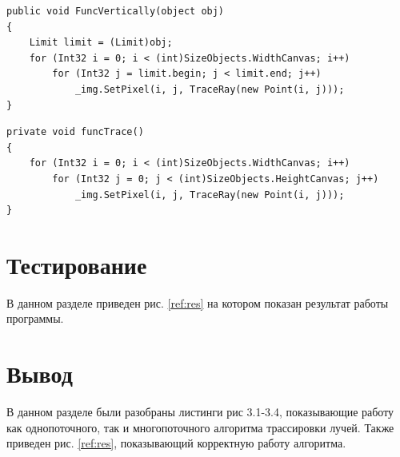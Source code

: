 \begin{lstlisting}[label=some-code,caption=Метод потока разбиения вертикально]
public void FuncVertically(object obj)
{
	Limit limit = (Limit)obj;
	for (Int32 i = 0; i < (int)SizeObjects.WidthCanvas; i++)
		for (Int32 j = limit.begin; j < limit.end; j++)
			_img.SetPixel(i, j, TraceRay(new Point(i, j)));
}
\end{lstlisting}

\begin{lstlisting}[label=some-code,caption=Однопоточный метод трассировки лучей.]
private void funcTrace()
{
	for (Int32 i = 0; i < (int)SizeObjects.WidthCanvas; i++)
		for (Int32 j = 0; j < (int)SizeObjects.HeightCanvas; j++)
			_img.SetPixel(i, j, TraceRay(new Point(i, j)));
}
\end{lstlisting}

\section{Тестирование}

В данном разделе приведен рис. \ref{ref:res} на котором показан результат работы программы.

\begin{figure}[ht!]
\end{figure}


\section{Вывод}

В данном разделе были разобраны листинги рис 3.1-3.4, показывающие работу как однопоточного, так и многопоточного
алгоритма трассировки лучей. Также приведен рис. \ref{ref:res}, показывающий корректную работу алгоритма.